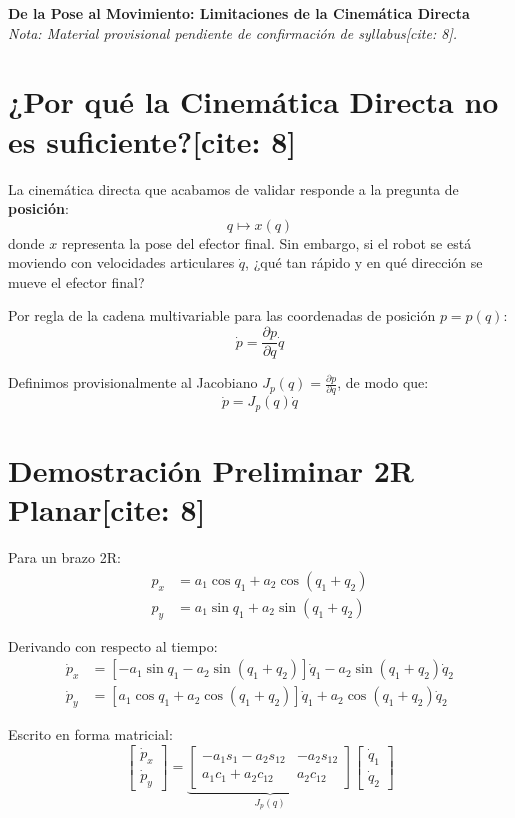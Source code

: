 \documentclass[11pt, a4paper]{article}
\begin{document}
\begin{center}
    \Large\textbf{De la Pose al Movimiento: Limitaciones de la Cinemática Directa}\\[0.2cm]
    \normalsize \textit{Nota: Material provisional pendiente de confirmación de syllabus[cite: 8].}
\end{center}

\section*{¿Por qué la Cinemática Directa no es suficiente?[cite: 8]}
La cinemática directa que acabamos de validar responde a la pregunta de \textbf{posición}:
\begin{equation*}
    q \longmapsto x(q)
\end{equation*}
donde $x$ representa la pose del efector final. Sin embargo, si el robot se está moviendo con velocidades articulares $\dot{q}$, ¿qué tan rápido y en qué dirección se mueve el efector final?

Por regla de la cadena multivariable para las coordenadas de posición $p = p(q)$:
\begin{equation*}
    \dot{p} = \frac{\partial p}{\partial q}\dot{q}
\end{equation*}

Definimos provisionalmente al Jacobiano $J_p(q) = \frac{\partial p}{\partial q}$, de modo que:
\begin{equation*}
    \dot{p} = J_p(q)\dot{q}
\end{equation*}

\section*{Demostración Preliminar 2R Planar[cite: 8]}
Para un brazo 2R:
\begin{align*}
    p_x &= a_1\cos q_1 + a_2\cos(q_1+q_2) \\
    p_y &= a_1\sin q_1 + a_2\sin(q_1+q_2)
\end{align*}

Derivando con respecto al tiempo:
\begin{align*}
    \dot{p}_x &= [-a_1\sin q_1 - a_2\sin(q_1+q_2)]\dot{q}_1 - a_2\sin(q_1+q_2)\dot{q}_2 \\
    \dot{p}_y &= [a_1\cos q_1 + a_2\cos(q_1+q_2)]\dot{q}_1 + a_2\cos(q_1+q_2)\dot{q}_2
\end{align*}

Escrito en forma matricial:
\begin{equation*}
    \begin{bmatrix} \dot{p}_x \\ \dot{p}_y \end{bmatrix} = 
    \underbrace{\begin{bmatrix} -a_1s_1 - a_2s_{12} & -a_2s_{12} \\ a_1c_1 + a_2c_{12} & a_2c_{12} \end{bmatrix}}_{J_p(q)}
    \begin{bmatrix} \dot{q}_1 \\ \dot{q}_2 \end{bmatrix}
\end{equation*}
\end{document}
